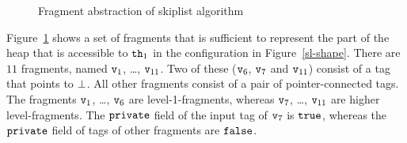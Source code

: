 \begin{figure}
\center
	
\caption{Fragment abstraction of skiplist algorithm}
\label{fig:skiplistabs}
\vspace*{-0.6cm}
\end{figure} 
Figure~\ref{fig:skiplistabs} shows a set of fragments that is sufficient to
represent the part of the heap that is accessible to
${\tt th}_1$ in the configuration in Figure~\ref{sl-shape}. There are $11$ fragments, named $\mathtt{v}_1$, \ldots , $\mathtt{v}_{11}$. Two of
these ($\mathtt{v}_6$, $\mathtt{v}_7$ and $\mathtt{v}_{11}$) consist of a tag that points to $\bot$. All other fragments consist of a pair of pointer-connected tags. The fragments $\mathtt{v}_1$, \ldots , $\mathtt{v}_{6}$ are  level-1-fragments, whereas $\mathtt{v}_7$, \ldots , $\mathtt{v}_{11}$ are higher level-fragments. The $\tt private$ field of the input tag of $\mathtt{v}_7$ is $\tt true$, whereas the $\tt private$ field of tags of other fragments are $\tt false$.

